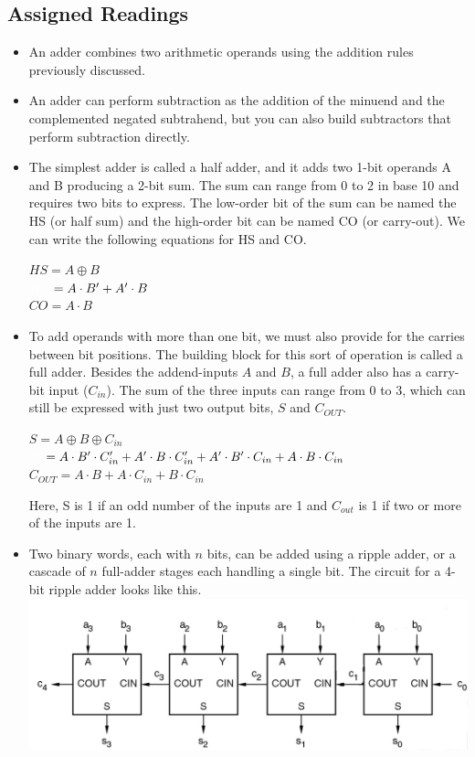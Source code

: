 \documentclass[10pt,a4paper]{article}
\begin{document}
\subsection{Assigned Readings}
\begin{itemize}
\item An adder combines two arithmetic operands using the addition rules previously discussed. 
\item An adder can perform subtraction as the addition of the minuend and the complemented negated subtrahend, but you can also build subtractors that perform subtraction directly. 
\item The simplest adder is called a half adder, and it adds two 1-bit operands A and B producing a 2-bit sum. The sum can range from 0 to 2 in base 10 and requires two bits to express. The low-order bit of the sum can be named the HS (or half sum) and the high-order bit can be named CO (or carry-out). We can write the following equations for HS and CO.
\begin{displayquote}
$HS=A\oplus B$\\
$\textcolor{white}{HS}=A\cdot B'+A'\cdot B$\\
$CO=A\cdot B$
\end{displayquote}
\pagebreak
\item To add operands with more than one bit, we must also provide for the carries between bit positions. The building block for this sort of operation is called a full adder. Besides the addend-inputs $A$ and $B$, a full adder also has a carry-bit input ($C_{in}$). The sum of the three inputs can range from 0 to 3, which can still be expressed with just two output bits, $S$ and $C_{OUT}$.
\begin{displayquote}
$S=A\oplus B\oplus C_{in}$\\
$\textcolor{white}{S}=A\cdot B'\cdot C_{in}'+A'\cdot B\cdot C_{in}'+A'\cdot B'\cdot C_{in}+A\cdot B\cdot C_{in}$\\
$C_{OUT}=A\cdot B+A\cdot C_{in}+B\cdot C_{in}$
\end{displayquote}
Here, S is 1 if an odd number of the inputs are 1 and $C_{out}$ is 1 if two or more of the inputs are 1. 
\item Two binary words, each with $n$ bits, can be added using a ripple adder, or a cascade of $n$ full-adder stages each handling a single bit. The circuit for a 4-bit ripple adder looks like this.\\
\includegraphics[scale=.7]{IMG6}\\

\end{itemize}
\end{document}
